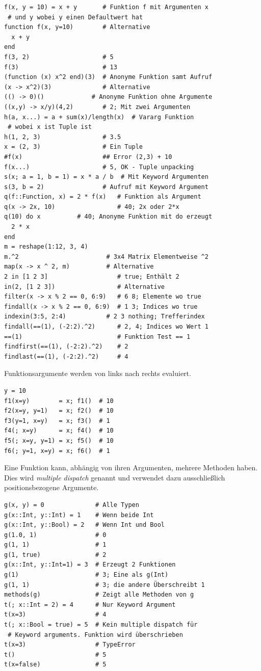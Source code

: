\documentclass[10pt,twocolumn]{scrartcl}
\begin{document}
\begin{lstlisting}
f(x, y = 10) = x + y       # Funktion f mit Argumenten x
 # und y wobei y einen Defaultwert hat
function f(x, y=10)        # Alternative
  x + y
end
f(3, 2)                    # 5
f(3)                       # 13
(function (x) x^2 end)(3)  # Anonyme Funktion samt Aufruf
(x -> x^2)(3)              # Alternative
(() -> 0)()             # Anonyme Funktion ohne Argumente
((x,y) -> x/y)(4,2)        # 2; Mit zwei Argumenten
h(a, x...) = a + sum(x)/length(x)  # Vararg Funktion
 # wobei x ist Tuple ist
h(1, 2, 3)                 # 3.5
x = (2, 3)                 # Ein Tuple
#f(x)                      ## Error (2,3) + 10
f(x...)                    # 5, OK - Tuple unpacking
s(x; a = 1, b = 1) = x * a / b  # Mit Keyword Argumenten
s(3, b = 2)                # Aufruf mit Keyword Argument
q(f::Function, x) = 2 * f(x)   # Funktion als Argument
q(x -> 2x, 10)                 # 40; 2x oder 2*x
q(10) do x          # 40; Anonyme Funktion mit do erzeugt
  2 * x
end
m = reshape(1:12, 3, 4)
m.^2                        # 3x4 Matrix Elementweise ^2
map(x -> x ^ 2, m)          # Alternative
2 in [1 2 3]                   # true; Enthält 2
in(2, [1 2 3])                 # Alternative
filter(x -> x % 2 == 0, 6:9)   # 6 8; Elemente wo true
findall(x -> x % 2 == 0, 6:9)  # 1 3; Indices wo true
indexin(3:5, 2:4)           # 2 3 nothing; Trefferindex
findall(==(1), (-2:2).^2)      # 2, 4; Indices wo Wert 1
==(1)                          # Funktion Test == 1
findfirst(==(1), (-2:2).^2)    # 2
findlast(==(1), (-2:2).^2)     # 4
\end{lstlisting}

Funktionsargumente werden von links nach rechts evaluiert.

\begin{lstlisting}
y = 10
f1(x=y)        = x; f1()  # 10
f2(x=y, y=1)   = x; f2()  # 10
f3(y=1, x=y)   = x; f3()  # 1
f4(; x=y)      = x; f4()  # 10
f5(; x=y, y=1) = x; f5()  # 10
f6(; y=1, x=y) = x; f6()  # 1
\end{lstlisting}

Eine Funktion kann, abhängig von ihren Argumenten, mehrere Methoden haben. Dies
wird \emph{multiple dispatch} genannt und verwendet dazu ausschließlich
positionsbezogene Argumente.

\begin{lstlisting}
g(x, y) = 0              # Alle Typen
g(x::Int, y::Int) = 1    # Wenn beide Int
g(x::Int, y::Bool) = 2   # Wenn Int und Bool
g(1.0, 1)                # 0
g(1, 1)                  # 1
g(1, true)               # 2
g(x::Int, y::Int=1) = 3  # Erzeugt 2 Funktionen
g(1)                     # 3; Eine als g(Int)
g(1, 1)                  # 3; die andere Überschreibt 1
methods(g)               # Zeigt alle Methoden von g
t(; x::Int = 2) = 4      # Nur Keyword Argument
t(x=3)                   # 4
t(; x::Bool = true) = 5  # Kein multiple dispatch für
 # Keyword arguments. Funktion wird überschrieben
t(x=3)                   # TypeError
t()                      # 5
t(x=false)               # 5
\end{lstlisting}
\end{document}
